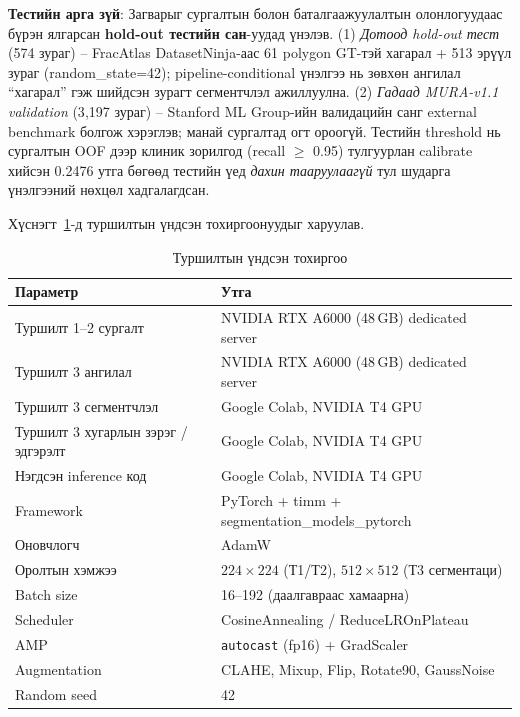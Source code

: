 \textbf{Тестийн арга зүй}: Загварыг сургалтын болон баталгаажуулалтын олонлогуудаас бүрэн ялгарсан \textbf{hold-out тестийн сан}-уудад үнэлэв. (1) \textit{Дотоод hold-out тест} (574 зураг) -- FracAtlas DatasetNinja-аас 61 polygon GT-тэй хагарал + 513 эрүүл зураг (random\_state=42); pipeline-conditional үнэлгээ нь зөвхөн ангилал ``хагарал'' гэж шийдсэн зурагт сегментчлэл ажиллуулна. (2) \textit{Гадаад MURA-v1.1 validation} (3{,}197 зураг) -- Stanford ML Group-ийн валидацийн санг external benchmark болгож хэрэглэв; манай сургалтад огт ороогүй. Тестийн threshold нь сургалтын OOF дээр клиник зорилгод (recall $\ge$ 0.95) тулгуурлан calibrate хийсэн 0.2476 утга бөгөөд тестийн үед \emph{дахин тааруулаагүй} тул шударга үнэлгээний нөхцөл хадгалагдсан.

Хүснэгт~\ref{tab:setup}-д туршилтын үндсэн тохиргоонуудыг харуулав.

\begin{table}[!htbp]
\centering
\small
\begin{tabular}{l l}
\toprule
\textbf{Параметр} & \textbf{Утга} \\
\midrule
Туршилт 1--2 сургалт & NVIDIA RTX A6000 (48\,GB) dedicated server \\[3pt]
Туршилт 3 ангилал & NVIDIA RTX A6000 (48\,GB) dedicated server \\[3pt]
Туршилт 3 сегментчлэл & Google Colab, NVIDIA T4 GPU \\[3pt]
Туршилт 3 хугарлын зэрэг / эдгэрэлт & Google Colab, NVIDIA T4 GPU \\[3pt]
Нэгдсэн inference код & Google Colab, NVIDIA T4 GPU \\[3pt]
Framework                & PyTorch + timm + segmentation\_models\_pytorch \\[3pt]
Оновчлогч                & AdamW \\[3pt]
Оролтын хэмжээ           & $224\times224$ (Т1/Т2), $512\times512$ (Т3 сегментаци) \\[3pt]
Batch size               & 16--192 (даалгавраас хамаарна) \\[3pt]
Scheduler                & CosineAnnealing / ReduceLROnPlateau \\[3pt]
AMP                      & \texttt{autocast} (fp16) + GradScaler \\[3pt]
Augmentation             & CLAHE, Mixup, Flip, Rotate90, GaussNoise \\[3pt]
Random seed              & 42 \\
\bottomrule
\end{tabular}
\caption{Туршилтын үндсэн тохиргоо}
\label{tab:setup}
\end{table}

